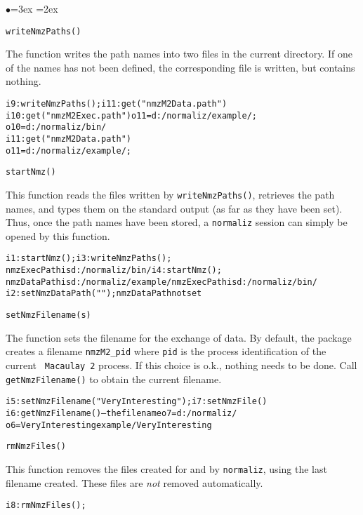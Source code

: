 \documentclass[11pt]{amsart}
\newenvironment{example}
  {\begin{alltt}\small}
  {\end{alltt}}
\newenvironment{functions}
  {\begin{list}{$\bullet$}{\leftmargin=3ex \labelwidth=2ex
  \listparindent=0pt \itemsep=6pt \parsep=3pt}}
  {\end{list}}
\begin{document}
\begin{functions}
\item \verb+writeNmzPaths()+

The function writes the path names into two files in the current
directory. If one of the names has not been defined, the
corresponding file is written, but contains nothing.
\begin{example}
i9 : writeNmzPaths();                   i11 : get("nmzM2Data.path")
i10 : get("nmzM2Exec.path")             o11 = d:/normaliz/example/;
o10 = d:/normaliz/bin/
i11 : get("nmzM2Data.path")
o11 = d:/normaliz/example/;
\end{example}

\item \verb+startNmz()+

This function reads the files written by \verb+writeNmzPaths()+,
retrieves the path names, and types them on the standard output
(as far as they have been set). Thus, once the path names have
been stored, a {\tt normaliz} session can simply be opened by this
function. 
\begin{example}
i1 : startNmz();                         i3 : writeNmzPaths();
nmzExecPath is d:/normaliz/bin/          i4 : startNmz();
nmzDataPath is d:/normaliz/example/      nmzExecPath is d:/normaliz/bin/
i2 : setNmzDataPath("");                 nmzDataPath not set
\end{example}

\item \verb+setNmzFilename(s)+

The function sets the filename for the exchange of data. By
default, the package creates a filename \verb+nmzM2_pid+ where
{\tt pid} is the process identification of the current {\tt
Macaulay 2} process. If this choice is o.k., nothing needs to be
done. Call \verb+getNmzFilename()+ to obtain the current filename.
\begin{example}
i5 : setNmzFilename("VeryInteresting");   i7 : setNmzFile()
i6 : getNmzFilename()  -- the file name   o7 = d:/normaliz/
o6 = VeryInteresting                              example/VeryInteresting
\end{example}


\item\verb+rmNmzFiles()+

This function removes the files created for and by {\tt normaliz},
using the last filename created. These files are \emph{not}
removed automatically.

\begin{example}
i8 : rmNmzFiles();
\end{example}

\end{functions}
\end{document}
